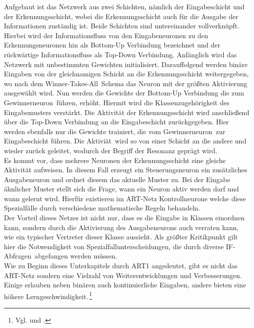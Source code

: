 Aufgebaut ist das Netzwerk aus zwei Schichten, nämlich der Eingabeschicht und der Erkennungsschicht, wobei die Erkennungsschicht auch für die Ausgabe der Informationen zuständig ist. Beide Schichten sind untereinander vollverknüpft. Hierbei wird der Informationsfluss von den Eingabeneuronen zu den Erkennungsneuronen hin als Bottom-Up Verbindung bezeichnet und der rückwärtige Informationsfluss als Top-Down Verbindung. Anfänglich wird das Netzwerk mit unbestimmten Gewichten initialisiert. Darauffolgend werden binäre Eingaben von der gleichnamigen Schicht an die Erkennungsschicht weitergegeben, wo nach dem \glqq Winner-Takes-All\grqq~Schema das Neuron mit der größten Aktivierung ausgewählt wird. Nun werden die Gewichte der Bottom-Up Verbindung die zum \glqq Gewinnerneuron\grqq~führen, erhöht. Hiermit wird die Klassenzugehörigkeit des Eingabemusters verstärkt. Die Aktivität der Erkennungsschicht wird anschließend über die Top-Down Verbindung an die Eingabeschicht zurückgegeben. Hier werden ebenfalls nur die Gewichte trainiert, die vom \glqq Gewinnerneuron\grqq~zur Eingabeschicht führen. Die \glqq Aktiviät\grqq~wird so von einer Schicht an die andere und wieder zurück geleitet, wodurch der Begriff der Resonanz geprägt wird.\\
Es kommt vor, dass mehrere Neuronen der Erkennungsschicht eine gleiche Aktivität aufweisen. In diesem Fall erzeugt ein Steuerungsneuron ein zusätzliches Ausgabeneuron und ordnet diesem das aktuelle Muster zu. Bei der Eingabe ähnlicher Muster stellt sich die Frage, wann ein Neuron aktiv werden darf und wann gelernt wird. Hierfür existieren im ART-Netz Kontrollneurone welche diese Spezialfälle durch verschiedene mathematische Regeln behandeln.\\
Der Vorteil dieses Netzes ist nicht nur, dass es die Eingabe in Klassen einordnen kann, sondern durch die Aktivierung des Ausgabeneurons auch verraten kann, wie ein typischer Vertreter dieser Klasse aussieht. Als größter Kritikpunkt gilt hier die Notwendigkeit von Spezialfallunterscheidungen, die durch diverse \glqq IF-Abfragen\grqq~abgefangen werden müssen.\,\\
Wie zu Beginn dieses Unterkapitels durch ART1 angedeutet, gibt es nicht das ART-Netz sondern eine Vielzahl von Weiterentwicklungen und Verbesserungen. Einige erlauben neben binären auch kontinuierliche Eingaben, andere bieten eine höhere Lerngeschwindigkeit.\,\footnote{Vgl. \citet[C2.2:1 ff]{Fiesler96} und \citet[89 ff]{Gurney1997}.} 



